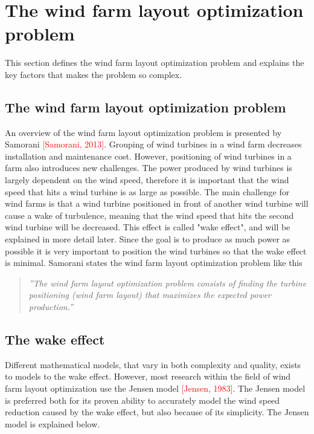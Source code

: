 \documentclass{article}
\begin{document}
\section{The wind farm layout optimization problem}


This section defines the wind farm layout optimization problem and explains the key factors that makes the problem so complex. 


\subsection{The wind farm layout optimization problem}


An overview of the wind farm layout optimization problem is presented by Samorani \textcolor{red}{[Samorani, 2013]}. Grouping of wind turbines in a wind farm decreases installation and maintenance cost. However, positioning of wind turbines in a farm also introduces new challenges. The power produced by wind turbines is largely dependent on the wind speed, therefore it is important that the wind speed that hits a wind turbine is as large as possible. The main challenge for wind farms is that a wind turbine positioned in front of another wind turbine will cause a wake of turbulence, meaning that the wind speed that hits the second wind turbine will be decreased. This effect is called "wake effect", and will be explained in more detail later. Since the goal is to produce as much power as possible it is very important to position the wind turbines so that the wake effect is minimal. Samorani states the wind farm layout optimization problem like this


\begin{quote}
\textit{''The wind farm layout optimization problem consists of finding the turbine positioning (wind farm layout) that maximizes the expected power production.''}
\end{quote}


\subsection{The wake effect}


Different mathematical models, that vary in both complexity and quality, exists to models to the wake effect. However, most research within the field of wind farm layout optimization use the Jensen model \textcolor{red}{[Jensen, 1983]}. The Jensen model is preferred both for its proven ability to accurately model the wind speed reduction caused by the wake effect, but also because of its simplicity. The Jensen model is explained below.
\end{document}

